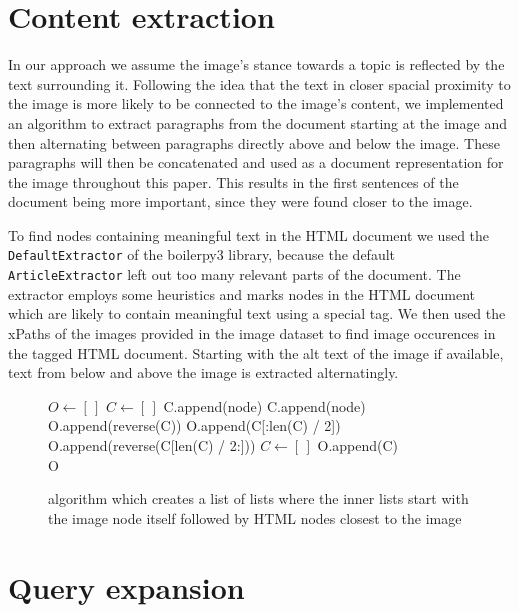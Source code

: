 \documentclass[
]{ceurart}
\begin{document}
\section{Content extraction} \label{content-extraction}

In our approach we assume the image's stance towards a topic is reflected by the text surrounding it. Following the idea that the text in closer spacial proximity to the image is more likely to be connected to the image's content, we implemented an algorithm to extract paragraphs from the document starting at the image and then alternating between paragraphs directly above and below the image. These paragraphs will then be concatenated and used as a document representation for the image throughout this paper. This results in the first sentences of the document being more important, since they were found closer to the image.

To find nodes containing meaningful text in the HTML document we used the \texttt{DefaultExtractor} of the boilerpy3 library, because the default \texttt{ArticleExtractor} left out too many relevant parts of the document. The extractor employs some heuristics and marks nodes in the HTML document which are likely to contain meaningful text using a special tag. We then used the xPaths of the images provided in the image dataset to find image occurences in the tagged HTML document. Starting with the alt text of the image if available, text from below and above the image is extracted alternatingly.

\begin{figure}
\begin{algorithmic}
	\State $O \gets [\,]$
	\State $C \gets [\,]$
			\State C.append(node)
		\EndIf
			\State C.append(node)
				\State O.append(reverse(C))
			\Else
				\State O.append(C[:len(C) / 2])
				\State O.append(reverse(C[len(C) / 2:]))
			\EndIf
			\State $C \gets [\,]$
		\EndIf
	\EndFor
\State O.append(C) \\
\Return O
\end{algorithmic}
\caption{algorithm which creates a list of lists where the inner lists start with the image node itself followed by HTML nodes closest to the image}
\end{figure}

\section{Query expansion}
\end{document}
